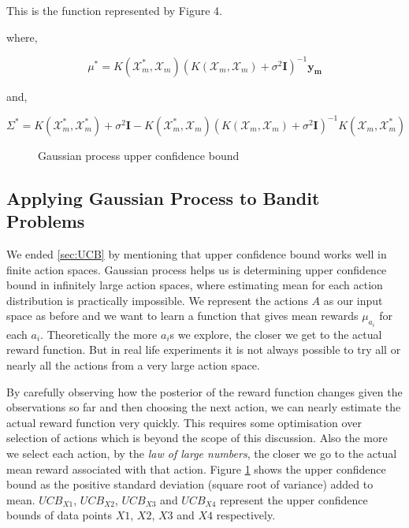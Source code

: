 \documentclass[english]{tktltiki}
\begin{document}
This is the function represented by Figure 4.

where,

\begin{equation}
\mu^* = K(\mathcal{X}_m^*, \mathcal{X}_m)(K(\mathcal{X}_m, \mathcal{X}_m) + \sigma^2 \mathbf{I})^{-1}\mathbf{y_m}
\label{gauss_poster_mean}
\end{equation}

and,

\begin{equation}
\Sigma^* = K(\mathcal{X}_m^*, \mathcal{X}_m^*) + \sigma^2 \mathbf{I} - K(\mathcal{X}_m^*, \mathcal{X}_m)(K(\mathcal{X}_m, \mathcal{X}_m) + \sigma^2 \mathbf{I})^{-1} K(\mathcal{X}_m, \mathcal{X}_m^*)
\label{gauss_poster_var}
\end{equation}

\begin{figure}[htb] 
\centering
 
\caption{Gaussian process upper confidence bound}
\label{fig:gp_ucb}
\end{figure}

\subsection{Applying Gaussian Process to Bandit Problems}

We ended \ref{sec:UCB} by mentioning that upper confidence bound works well in finite action spaces. Gaussian process helps us is determining upper confidence bound in infinitely large action spaces, where estimating mean for each action distribution is practically impossible. We represent the actions $A$ as our input space as before and we want to learn a function that gives mean rewards $\mu_{a_i}$ for each $a_i$. Theoretically the more $a_i$s we explore, the closer we get to the actual reward function. But in real life experiments it is not always possible to try all or nearly all the actions from a very large action space.





By carefully observing how the posterior of the reward function changes given the observations so far and then choosing the next action, we can nearly estimate the actual reward function very quickly. This requires some optimisation over selection of actions which is beyond the scope of this discussion. Also the more we select each action, by the \textit{law of large numbers}, the closer we go to the actual mean reward associated with that action. Figure \ref{fig:gp_ucb} shows the upper confidence bound as the positive standard deviation (square root of variance) added to mean. $UCB_{X1}$, $UCB_{X2}$, $UCB_{X3}$ and $UCB_{X4}$ represent the upper confidence bounds of data points $X1$, $X2$, $X3$ and $X4$ respectively.
\end{document}

